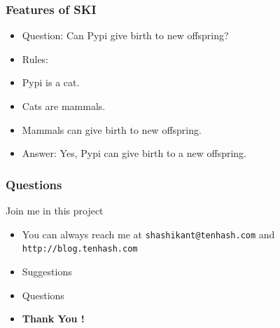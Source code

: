 \documentclass{beamer}
\begin{document}
\begin{frame}
 \frametitle{Features of SKI}
 \begin{example}
  \begin{itemize}

  \item  \alert{Question:} Can Pypi give birth to new offspring?
   \pause	
   \item \alert{Rules:}
   \item Pypi is a cat.
   \item Cats are mammals.
   \item Mammals can give birth to new offspring.
   \pause
   \item \alert{Answer:} Yes, Pypi can give birth to a new offspring.  
  \end{itemize}
 \end{example}
\end{frame}


\begin{frame}
 \frametitle{Questions}
 \begin{block}{Join me in this project}
  \begin{itemize}
  \pause
  \item You can always reach me at \texttt{shashikant@tenhash.com} and \texttt{http://blog.tenhash.com} 
  \pause
   \item Suggestions
    \pause
   \item Questions
   \pause
   \item \textbf{Thank You !}
  \end{itemize}

 \end{block}

\end{frame}



 
\end{document}
